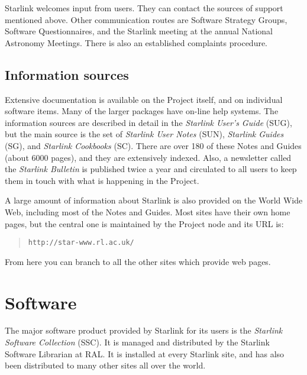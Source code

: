 \documentclass[twoside,11pt]{article}
\newcommand{\htmladdnormallink}[2]{#1}
\newcommand{\xref}[3]{#1}
\begin{document}
Starlink welcomes input from users.
They can contact the sources of support mentioned above.
Other communication routes are Software Strategy Groups, Software
Questionnaires, and the Starlink meeting at the annual National Astronomy
Meetings.
There is also an established complaints procedure.

\newpage

\subsection*{Information sources}

Extensive 
\htmladdnormallink{documentation}{http://star-www.rl.ac.uk/documentation.html}
is available on the Project itself, and on individual software items.
Many of the larger packages have on-line help systems.
The information sources are described in detail in the {\em Starlink User's
Guide} (\xref{SUG}{sug}{}), but the main source is the set of
{\em Starlink User Notes}\/ (\htmladdnormallink{SUN}{http://star-www.rl.ac.uk/sun.html}),
{\em Starlink Guides}\/ (\htmladdnormallink{SG}{http://star-www.rl.ac.uk/sg.html}),
and {\em Starlink Cookbooks}\/ (\htmladdnormallink{SC}{http://star-www.rl.ac.uk/sc.html}).
There are over 180 of these Notes and Guides (about 6000 pages), and they
are extensively indexed.
Also, a newsletter called the 
{\em \htmladdnormallink{Starlink Bulletin}
{http://star-www.rl.ac.uk/bulletin.html}} 
is published twice a year and circulated to all users to keep them in touch
with what is happening in the Project.

A large amount of information about Starlink is also provided on the World
Wide Web, including most of the Notes and Guides.
Most sites have their own home pages, but the central one is maintained
by the 
\htmladdnormallink{Project node}{http://star-www.rl.ac.uk/}
 and its URL is:
\begin{quote}
{\tt http://star-www.rl.ac.uk/}
\end{quote}
From here you can branch to all the other sites which provide web pages.

\newpage

\section*{Software}

The major software product provided by Starlink for its users is the
{\em Starlink Software Collection}\/ 
(\htmladdnormallink{SSC}{http://star-www.rl.ac.uk/software.html}).
It is managed and distributed by the Starlink Software Librarian at RAL.
It is installed at every Starlink site, and has also been distributed to
many other sites all over the world.
\end{document}
